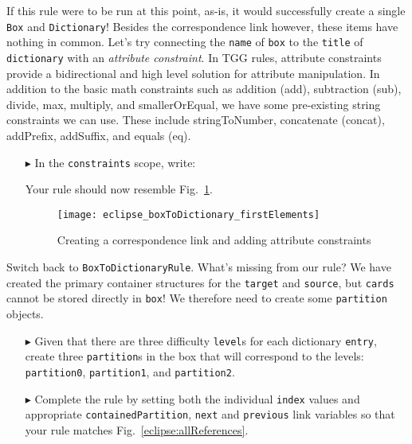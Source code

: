 If this rule were to be run at this point, as-is, it would successfully create a single \texttt{Box} and \texttt{Dictionary}! Besides the correspondence link
however, these items have nothing in common. Let's try connecting the \texttt{name} of \texttt{box} to the \texttt{title} of \texttt{dictionary} with an
\emph{attribute constraint}. In TGG rules, attribute constraints provide a bidirectional and high level solution for attribute manipulation. In addition to the
basic math constraints such as addition (add), subtraction (sub), divide, max, multiply, and smallerOrEqual, we have some pre-existing string constraints we can
use. These include stringToNumber, concatenate (concat), addPrefix, addSuffix, and equals (eq).

\begin{itemize}

\item[$\blacktriangleright$] In the \texttt{constraints} scope, write:


Your rule should now resemble Fig.~\ref{eclipse:ruleBasic}.

\vspace{0.5cm}

\begin{figure}[htbp]
\begin{center}
  \texttt{[image: eclipse\_boxToDictionary\_firstElements]}
  \caption{Creating a correspondence link and adding attribute constraints}
  \label{eclipse:ruleBasic}
\end{center}
\end{figure}

\end{itemize}

Switch back to \texttt{BoxToDictionaryRule}. What's missing from our rule? We have created the primary container structures for the \texttt{target} and
\texttt{source}, but \texttt{cards} cannot be stored directly in \texttt{box}! We therefore need to create some \texttt{partition} objects. 

\begin{itemize}

\item[$\blacktriangleright$] Given that there are three difficulty \texttt{level}s for each dictionary \texttt{entry}, create three \texttt{partition}s in the
box that will correspond to the levels: \texttt{partition0}, \texttt{partition1}, and \texttt{partition2}. 

\vspace{0.5cm}

\item[$\blacktriangleright$] Complete the rule by setting both the individual \texttt{index} values and appropriate \texttt{containedPartition},
\texttt{next} and \texttt{previous} link variables so that your rule matches Fig.~\ref{eclipse:allReferences}.

\end{itemize}

